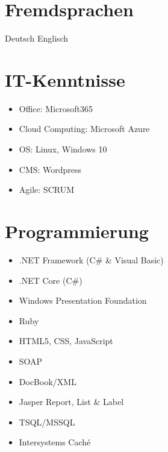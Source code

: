 \documentclass[a4paper]{friggeri-cv} %
\begin{document}

\section{Fremdsprachen}
Deutsch %
Englisch %

\section{IT-Kenntnisse}
\begin {itemize}
	\item Office: Microsoft365 
  \item Cloud Computing: Microsoft Azure
	\item OS: Linux, Windows 10
	\item CMS: Wordpress 
	\item Agile: SCRUM 
\end{itemize}

\section{Programmierung}
\begin{itemize}
	\item .NET Framework (C\# \& Visual Basic) 
	\item .NET Core (C\#) 
	\item Windows Presentation Foundation
	\item Ruby 
	\item HTML5, CSS, JavaScript 
	\item SOAP 
	\item DocBook/XML
	\item Jasper Report, List \& Label
	\item TSQL/MSSQL 
	\item Intersystems Caché
\end{itemize}

\end{document}
